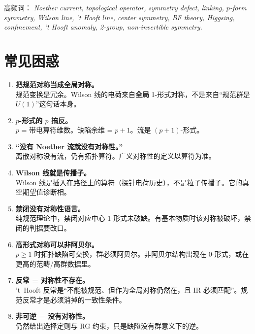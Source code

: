 \documentclass[11pt,a4paper]{article}
\theoremstyle{definition}
\theoremstyle{plain}
\theoremstyle{remark}
\begin{document}
高频词：
\textit{Noether current, topological operator, symmetry defect, linking, $p$-form symmetry, Wilson line, 't Hooft line, center symmetry, BF theory, Higgsing, confinement, 't Hooft anomaly, 2-group, non-invertible symmetry.}

\section{常见困惑}
\label{sec:faq}

\begin{enumerate}[leftmargin=1.8em]
  \item \textbf{把规范对称当成全局对称。}\\
  规范变换是冗余。Wilson 线的电荷来自\textbf{全局} 1-形式对称，不是来自``规范群是 $U(1)$''这句话本身。

  \item \textbf{$p$-形式的 $p$ 搞反。}\\
  $p$ = 带电算符维数。缺陷余维 = $p+1$。流是 $(p+1)$-形式。

  \item \textbf{``没有 Noether 流就没有对称性。''}\\
  离散对称没有流，仍有拓扑算符。广义对称性的定义以算符为准。

  \item \textbf{Wilson 线就是传播子。}\\
  Wilson 线是插入在路径上的算符（探针电荷历史），不是粒子传播子。它的真空期望值诊断相。

  \item \textbf{禁闭没有对称性语言。}\\
  纯规范理论中，禁闭对应中心 1-形式未破缺。有基本物质时该对称被破坏，禁闭的判据要改口。

  \item \textbf{高形式对称可以非阿贝尔。}\\
  $p\ge 1$ 时拓扑缺陷可交换，群必须阿贝尔。非阿贝尔结构出现在 $0$-形式，或在更高的范畴/高群数据里。

  \item \textbf{反常 = 对称性不存在。}\\
  't~Hooft 反常是``不能被规范、但作为全局对称仍然在，且 IR 必须匹配''。规范反常才是必须消掉的一致性条件。

  \item \textbf{非可逆 = 没有对称性。}\\
  仍然给出选择定则与 RG 约束，只是缺陷没有群意义下的逆。
\end{enumerate}
\end{document}
